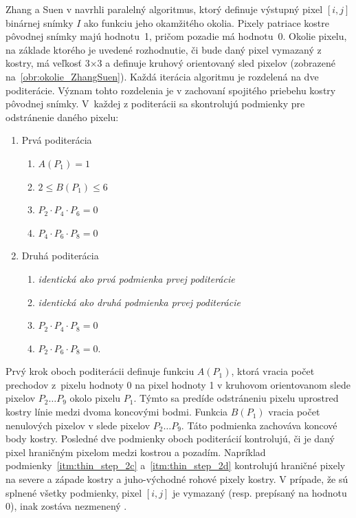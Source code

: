   Zhang a Suen v \cite{ZhangSuen_thinning} navrhli paralelný algoritmus, ktorý definuje výstupný pixel $[i,j]$ binárnej snímky $I$ ako funkciu jeho okamžitého
  okolia. Pixely patriace kostre
  pôvodnej snímky majú hodnotu~1, pričom pozadie má hodnotu~0. Okolie pixelu, na základe ktorého je uvedené rozhodnutie, či bude daný pixel vymazaný z kostry,
  má veľkosť $3$$\times{}$$3$ a definuje kruhový orientovaný sled pixelov (zobrazené na~{\ref{obr:okolie_ZhangSuen}}).
  Každá iterácia algoritmu je rozdelená na dve poditerácie. Význam tohto rozdelenia je v zachovaní spojitého priebehu kostry pôvodnej snímky.
  V~každej z poditerácii sa skontrolujú podmienky pre odstránenie daného pixelu:
  \begin{enumerate}
    \item Prvá poditerácia \label{itm:thin_step_1}
    \begin{enumerate}
      \item $A(P_1) = 1$  \label{itm:thin_step_1a}
      \item $2 \leq B(P_1) \leq 6$ \label{itm:thin_step_1b}
      \item $P_2 \cdot P_4 \cdot P_6 = 0$ \label{itm:thin_step_1c}
      \item $P_4 \cdot P_6 \cdot P_8 = 0$ \label{itm:thin_step_1d}
    \end{enumerate}
    \item Druhá poditerácia \label{itm:thin_step_2}
    \begin{enumerate}
      \item \emph{identická ako prvá podmienka prvej poditerácie} \label{itm:thin_step_2a}
      \item \emph{identická ako druhá podmienka prvej poditerácie} \label{itm:thin_step_2b}
      \item $P_2 \cdot P_4 \cdot P_8 = 0$ \label{itm:thin_step_2c}
      \item $P_2 \cdot P_6 \cdot P_8 = 0$. \label{itm:thin_step_2d}
    \end{enumerate}
  \end{enumerate}

  Prvý krok oboch poditerácii definuje funkciu $A(P_1)$, ktorá vracia počet prechodov z~pixelu hodnoty 0 na pixel hodnoty 1 v kruhovom orientovanom slede
  pixelov $P_2\dots{}P_9$ okolo pixelu $P_1$. Týmto sa predíde odstráneniu pixelu uprostred kostry línie medzi dvoma koncovými bodmi.
  Funkcia $B(P_1)$ vracia počet nenulových pixelov v slede pixelov $P_2\dots{}P_9$. Táto podmienka zachováva koncové body
  kostry. Posledné dve podmienky oboch poditerácií kontrolujú, či je daný pixel hraničným pixelom medzi kostrou a pozadím.
  Napríklad podmienky~{\ref{itm:thin_step_2c}} a~{\ref{itm:thin_step_2d}} kontrolujú hraničné pixely na severe a západe kostry a juho-východné rohové pixely
  kostry. V prípade, že sú splnené všetky podmienky, pixel $[i,j]$ je vymazaný (resp. prepísaný na hodnotu 0), inak zostáva nezmenený \cite{ZhangSuen_thinning}.

